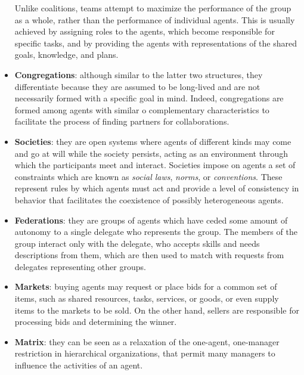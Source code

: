 \begin{itemize}
    Unlike coalitions, teams attempt to maximize the performance of the group as a whole, rather than the performance of individual agents.
    This is usually achieved by assigning roles to the agents, which become responsible for specific tasks, and by providing the agents with representations of the shared goals, knowledge, and plans.
    \item \textbf{Congregations}: although similar to the latter two structures, they differentiate because they are assumed to be long-lived and are not necessarily formed with a specific goal in mind.
    Indeed, congregations are formed among agents with similar o complementary characteristics to facilitate the process of finding partners for collaborations.
    \item \textbf{Societies}: they are open systems where agents of different kinds may come and go at will while the society persists, acting as an environment through which the participants meet and interact.
    Societies impose on agents a set of constraints which are known as \textit{social laws}, \textit{norms}, or \textit{conventions}.
    These represent rules by which agents must act and provide a level of consistency in behavior that facilitates the coexistence of possibly heterogeneous agents.
    \item \textbf{Federations}: they are groups of agents which have ceded some amount of autonomy to a single delegate who represents the group.
    The members of the group interact only with the delegate, who accepts skills and needs descriptions from them, which are then used to match with requests from delegates representing other groups.
    \item \textbf{Markets}: buying agents may request or place bids for a common set of items, such as shared resources, tasks, services, or goods, or even supply items to the markets to be sold.
    On the other hand, sellers are responsible for processing bids and determining the winner.
    \item \textbf{Matrix}: they can be seen as a relaxation of the one-agent, one-manager restriction in hierarchical organizations, that permit many managers to influence the activities of an agent.
\end{itemize}

